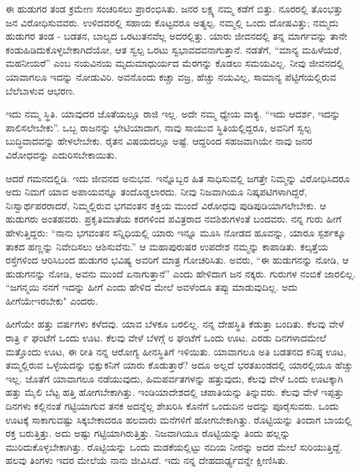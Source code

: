 \vskip  2pt

ಈ ಹುಡುಗರ ತಂಡ ಕ್ರಮೇಣ ಸಂಚರಿಸಲು ಪ್ರಾರಂಭಿಸಿತು. ಜನರ ಲಕ್ಷ್ಯ ನಮ್ಮ ಕಡೆಗೆ ಬಿತ್ತು. ನೂರರಲ್ಲಿ ತೊಂಭತ್ತು ಜನ ವಿರೋಧಿಸುವವರು. ಉಳಿದವರಲ್ಲಿ ಸಹಾಯ ಕೊಟ್ಟವರೂ ಅತ್ಯಲ್ಪ. ನಮ್ಮಲ್ಲಿ ಒಂದು ದೋಷವಿತ್ತು; ನಮ್ಮದು ಹುಡುಗರ ತಂಡ - ಬಡತನ, ಬಾಲ್ಯದ ಒರಟುತನವೆಲ್ಲ ಅದರಲ್ಲಿತ್ತು. ಯಾರು ಜೀವನದಲ್ಲಿ ತನ್ನ ಮಾರ್ಗವನ್ನು ತಾನೇ ಕಂಡುಹಿಡಿದುಕೊಳ್ಳಬೇಕಾಗಿದೆಯೋ, ಆತ ಸ್ವಲ್ಪ ಒರಟು ಸ್ವಭಾವದವನಾಗುತ್ತಾನೆ. ನಡತೆಗೆ, “ಮಾನ್ಯ ಮಹಿಳೆಯರೆ, ಮಹನೀಯರೆ” ಎಂಬ ನಯವಿನಯ ಮೃದುಮಾಧುರ್ಯದ ಮೆರಗನ್ನು ಕೊಡಲು ಸಮಯವಿಲ್ಲ. ನೀವು ಜೀವನದಲ್ಲಿ ಯಾವಾಗಲೂ ಇದನ್ನು ನೋಡುವಿರಿ. ಅವನೊಂದು ಕಚ್ಚಾ ವಜ್ರ, ಹೆಚ್ಚು ನಯವಿಲ್ಲ, ಸಾಮಾನ್ಯ ಪೆಟ್ಟಿಗೆಯಲ್ಲಿರುವ ಬೆಲೆಬಾಳುವ ಆಭರಣ.

\vskip  2pt

ಇದು ನಮ್ಮ ಸ್ಥಿತಿ. ಯಾವುದರ ಜೊತೆಯಲ್ಲೂ ರಾಜಿ ಇಲ್ಲ. ಅದೇ ನಮ್ಮ ಧ್ಯೇಯ ವಾಕ್ಯ. “ಇದು ಆದರ್ಶ, ಇದನ್ನು ಪಾಲಿಸಲೇಬೇಕು”. ಒಬ್ಬ ರಾಜನನ್ನು ಭೇಟಿಯಾದಾಗ, ನಾವು ಸಾಯುವ ಸ್ಥಿತಿಯಲ್ಲಿದ್ದರೂ, ಅವನಿಗೆ ಸ್ವಲ್ಪ ಬುದ್ಧಿವಾದವನ್ನು ಹೇಳಲೇಬೇಕು. ರೈತನ ವಿಷಯದಲ್ಲೂ ಅಷ್ಟೆ. ಆದ್ದರಿಂದ ಸಹಜವಾಗಿಯೇ ನಾವು ಜನರ ವಿರೋಧವನ್ನು ಎದುರಿಸಬೇಕಾಯಿತು.

ಆದರೆ ಗಮನದಲ್ಲಿಡಿ. ಇದು ಜೀವನದ ಅನುಭವ. ಇನ್ನೊಬ್ಬರ ಹಿತ ಸಾಧಿಸುವಲ್ಲಿ ಜಗತ್ತೇ ನಿಮ್ಮನ್ನು ವಿರೋಧಿಸಿದರೂ ಅದು ನಿಮಗೆ ಯಾವ ಅಪಾಯವನ್ನೂ ತಂದೊಡ್ಡಲಾರದು. ನೀವು ನಿಜವಾಗಿಯೂ ನಿಷ್ಕಪಟಿಗಳಾಗಿದ್ದರೆ, ನಿಃಸ್ವಾರ್ಥಪರರಾದರೆ, ನಿಮ್ಮಲ್ಲಿರುವ ಭಗವಂತನ ಶಕ್ತಿಯ ಮುಂದೆ ವಿರೋಧವು ಪುಡಿಪುಡಿಯಾಗಲೇಬೇಕು. ಆ ಹುಡುಗರು ಅಂತಹವರು. ಪ್ರಕೃತಿಮಾತೆಯ ಕರಗಳಿಂದ ಪವಿತ್ರರಾದ ನವಶಿಶುಗಳಂತೆ ಬಂದವರು. ನನ್ನ ಗುರು ಹೀಗೆ ಹೇಳುತ್ತಿದ್ದರು: “ನಾನು ಭಗವಂತನ ಸನ್ನಿಧಿಯಲ್ಲಿ ಯಾರು ಇನ್ನೂ ಮೂಸಿ ನೋಡದ ಹೂವನ್ನು, ಯಾರೂ ಸ್ಪರ್ಶಕ್ಕೂ ತಾಕದ ಹಣ್ಣನ್ನು ನಿವೇದಿಸಲು ಆಶಿಸುವೆನು.” ಆ ಮಹಾಪುರುಷರ ಉಪದೇಶ ನಮ್ಮನ್ನು ಕಾಪಾಡಿತು. ಕಲ್ಕತ್ತೆಯ ರಸ್ತೆಗಳಿಂದ ಆರಿಸಿಬಂದ ಹುಡುಗರ ಭವಿಷ್ಯ ಅವರಿಗೆ ಮಾತ್ರ ಗೋಚರಿಸಿತು. ಅವರು, “ಈ ಹುಡುಗನನ್ನು ನೋಡಿ, ಆ ಹುಡುಗನನ್ನು ನೋಡಿ, ಅವನು ಮುಂದೆ ಏನಾಗುತ್ತಾನೆ” ಎಂದು ಹೇಳಿದಾಗ ಜನ ನಕ್ಕರು. ಗುರುಗಳ ನಂಬಿಕೆ ಜಾರಲಿಲ್ಲ. “ಜಗನ್ಮಯಿ ನನಗೆ ಇದನ್ನು ಹೀಗೆ ಎಂದು ಹೇಳಿದ ಮೇಲೆ ಅವಳೆಂದೂ ತಪ್ಪು ಮಾಡುವುದಿಲ್ಲ. ಅದು ಹೀಗೆಯೇ\break ಇರಬೇಕು" ಎಂದರು.

ಹೀಗೆಯೇ ಹತ್ತು ವರ್ಷಗಳು ಕಳೆದವು. ಯಾವ ಬೆಳಕೂ ಬರಲಿಲ್ಲ. ನನ್ನ ದೇಹಸ್ಥಿತಿ ಕೆಡುತ್ತಾ ಬಂದಿತು. ಕೆಲವು ವೇಳೆ ರಾತ್ರಿ ೯ ಘಂಟೆಗೆ ಒಂದು ಊಟ. ಕೆಲವು ವೇಳೆ ಬೆಳಗ್ಗೆ ೮ ಘಂಟೆಗೆ ಒಂದು ಊಟ. ಎರಡು ದಿನಗಳಾದಮೇಲೆ ಮತ್ತೊಂದು ಊಟ, ಈ ರೀತಿ ನನ್ನ ಆರೋಗ್ಯ ಹೀನಸ್ಥಿತಿಗೆ ಇಳಿಯಿತು. ಯಾವಾಗಲೂ ಅತಿ ಬಡತನದ ಕನಿಷ್ಠ ಊಟ, ತಮ್ಮಲ್ಲಿರುವ ಒಳ್ಳೆಯದನ್ನು ಭಿಕ್ಷುಕನಿಗೆ ಯಾರು ಕೊಡುತ್ತಾರೆ? ಅದೂ ಅಲ್ಲದೆ ಭರತಖಂಡದಲ್ಲಿ ಯಾರಲ್ಲಿಯೂ ಹೆಚ್ಚು ಇಲ್ಲ. ಜೊತೆಗೆ ಯಾವಾಗಲೂ ನಡೆಯುವುದು, ಹಿಮಪರ್ವತಗಳನ್ನು ಹತ್ತುವುದು, ಕೆಲವು ವೇಳೆ ಒಂದು ಊಟಕ್ಕಾಗಿ ಹತ್ತು ಮೈಲಿ ಬೆಟ್ಟ ಹತ್ತಿ ಹೋಗಬೇಕಾಗಿತ್ತು. ಇಂಡಿಯಾದೇಶದಲ್ಲಿ ಚಪಾತಿಯನ್ನು ತಿನ್ನುವರು. ಕೆಲವು ವೇಳೆ ಇಪ್ಪತ್ತು ದಿನಗಳು ಕಲ್ಲಿನಂತೆ ಗಟ್ಟಿಯಾಗುವ ತನಕ ಅದನ್ನೆಲ್ಲ ಶೇಖರಿಸಿ ಕೊನೆಗೆ ಒಂದುದಿನ ಅದನ್ನು ಪೂರೈಸುವರು. ಒಂದು ಊಟಕ್ಕೆ ಸಾಕಾಗುವಷ್ಟು ಸಿಕ್ಕಬೇಕಾದರೂ ಹಲವಾರು ಮನೆಗಳಿಗೆ ಹೋಗಬೇಕಾಗಿತ್ತು. ರೊಟ್ಟಿಯನ್ನು ತಿಂದಾಗ ಬಾಯಲ್ಲಿ ರಕ್ತ ಬರುತ್ತಿತ್ತು. ಅದು ಅಷ್ಟು ಗಟ್ಟಿಯಾಗಿರುತ್ತಿತ್ತು. ನಿಜವಾಗಿಯೂ ರೊಟ್ಟಿಯನ್ನು ತಿಂದು ಹಲ್ಲನ್ನು ಮುರಿದುಕೊಳ್ಳಬೇಕಾಗಿತ್ತು. ರೊಟ್ಟಿಯನ್ನು ಒಂದು ಮಡಕೆಯಲ್ಲಿಟ್ಟು ನದಿಯ ನೀರನ್ನು ಅದರ ಮೇಲೆ ಸುರಿಯುತ್ತಿದ್ದೆ. ಹಲವು ತಿಂಗಳು ಇದರ ಮೇಲೆಯೆ ನಾನು ಜೀವಿಸಿದೆ. ಇದು ನನ್ನ ದೇಹದಾರ್ಢ್ಯವನ್ನೇ ಕ್ಷೀಣಿಸಿತು.

